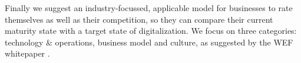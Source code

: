 Finally we suggest an industry-focussed, applicable model for businesses to rate themselves as well as their competition, so they can compare their current maturity state with a target state of digitalization. We focus on three categories: technology \& operations, business model and culture, as suggested by the \ac{WEF} whitepaper \cite{worldforumdigitalenterprise:2016}.


